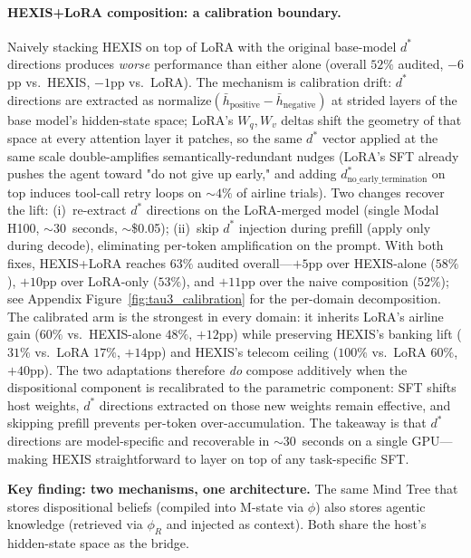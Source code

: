 \paragraph{HEXIS+LoRA composition: a calibration boundary.} \label{sec:lora_composition_calibration}
Naively stacking HEXIS on top of LoRA with the original base-model $d^*$ directions produces \emph{worse} performance than either alone (overall $52\%$ audited, $-6$pp vs.\ HEXIS, $-1$pp vs.\ LoRA). The mechanism is calibration drift: $d^*$ directions are extracted as $\text{normalize}(\bar h_\text{positive} - \bar h_\text{negative})$ at strided layers of the base model's hidden-state space; LoRA's $W_q, W_v$ deltas shift the geometry of that space at every attention layer it patches, so the same $d^*$ vector applied at the same scale double-amplifies semantically-redundant nudges (LoRA's SFT already pushes the agent toward "do not give up early," and adding $d^*_\text{no\_early\_termination}$ on top induces tool-call retry loops on $\sim4\%$ of airline trials). Two changes recover the lift: (i)~re-extract $d^*$ directions on the LoRA-merged model (single Modal H100, $\sim$30~seconds, $\sim$\$0.05); (ii)~skip $d^*$ injection during prefill (apply only during decode), eliminating per-token amplification on the prompt. With both fixes, HEXIS+LoRA reaches $63\%$ audited overall---$+5$pp over HEXIS-alone ($58\%$), $+10$pp over LoRA-only ($53\%$), and $+11$pp over the naive composition ($52\%$); see Appendix Figure~\ref{fig:tau3_calibration} for the per-domain decomposition. The calibrated arm is the strongest in every domain: it inherits LoRA's airline gain ($60\%$ vs.\ HEXIS-alone $48\%$, $+12$pp) while preserving HEXIS's banking lift ($31\%$ vs.\ LoRA $17\%$, $+14$pp) and HEXIS's telecom ceiling ($100\%$ vs.\ LoRA $60\%$, $+40$pp). The two adaptations therefore \emph{do} compose additively when the dispositional component is recalibrated to the parametric component: SFT shifts host weights, $d^*$ directions extracted on those new weights remain effective, and skipping prefill prevents per-token over-accumulation. The takeaway is that $d^*$ directions are model-specific and recoverable in $\sim$30~seconds on a single GPU---making HEXIS straightforward to layer on top of any task-specific SFT.

\textbf{Key finding: two mechanisms, one architecture.} The same Mind Tree that stores dispositional beliefs (compiled into M-state via $\phi$) also stores agentic knowledge (retrieved via $\phi_R$ and injected as context). Both share the host's hidden-state space as the bridge.

